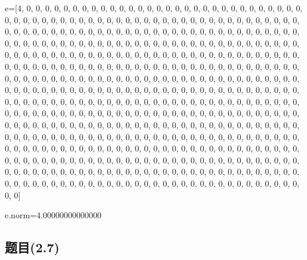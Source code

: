 \documentclass[12pt,a4paper]{article}
\numberwithin{equation}{section}
\begin{document}
e=[4, 0, 0, 0, 0, 0, 0, 0, 0, 0, 0, 0, 0, 0, 0, 0, 0, 0, 0, 0, 0, 0, 0, 0, 0, 0, 0, 0, 0, 0, 0, 0, 0, 0, 0, 0, 0, 0, 0, 0, 0, 0, 0, 0, 0, 0, 0, 0, 0, 0, 0, 0, 0, 0, 0, 0, 0, 0, 0, 0, 0, 0, 0, 0, 0, 0, 0, 0, 0, 0, 0, 0, 0, 0, 0, 0, 0, 0, 0, 0, 0, 0, 0, 0, 0, 0, 0, 0, 0, 0, 0, 0, 0, 0, 0, 0, 0, 0, 0, 0, 0, 0, 0, 0, 0, 0, 0, 0, 0, 0, 0, 0, 0, 0, 0, 0, 0, 0, 0, 0, 0, 0, 0, 0, 0, 0, 0, 0, 0, 0, 0, 0, 0, 0, 0, 0, 0, 0, 0, 0, 0, 0, 0, 0, 0, 0, 0, 0, 0, 0, 0, 0, 0, 0, 0, 0, 0, 0, 0, 0, 0, 0, 0, 0, 0, 0, 0, 0, 0, 0, 0, 0, 0, 0, 0, 0, 0, 0, 0, 0, 0, 0, 0, 0, 0, 0, 0, 0, 0, 0, 0, 0, 0, 0, 0, 0, 0, 0, 0, 0, 0, 0, 0, 0, 0, 0, 0, 0, 0, 0, 0, 0, 0, 0, 0, 0, 0, 0, 0, 0, 0, 0, 0, 0, 0, 0, 0, 0, 0, 0, 0, 0, 0, 0, 0, 0, 0, 0, 0, 0, 0, 0, 0, 0, 0, 0, 0, 0, 0, 0, 0, 0, 0, 0, 0, 0, 0, 0, 0, 0, 0, 0, 0, 0, 0, 0, 0, 0, 0, 0, 0, 0, 0, 0, 0, 0, 0, 0, 0, 0, 0, 0, 0, 0, 0, 0, 0, 0, 0, 0, 0, 0, 0, 0, 0, 0, 0, 0, 0, 0, 0, 0, 0, 0, 0, 0, 0, 0, 0, 0, 0, 0, 0, 0, 0, 0, 0, 0, 0, 0, 0, 0, 0, 0, 0, 0, 0, 0, 0, 0, 0, 0, 0, 0, 0, 0, 0, 0, 0, 0, 0, 0, 0, 0, 0, 0, 0, 0, 0, 0, 0, 0, 0, 0, 0, 0, 0, 0, 0, 0, 0, 0, 0, 0, 0, 0, 0, 0, 0, 0, 0, 0, 0, 0, 0, 0, 0, 0, 0, 0, 0, 0, 0, 0, 0, 0, 0, 0, 0, 0, 0, 0, 0, 0, 0, 0, 0, 0, 0, 0, 0, 0, 0, 0, 0, 0, 0, 0, 0, 0, 0, 0, 0, 0, 0, 0, 0, 0, 0, 0, 0, 0, 0, 0, 0, 0, 0, 0, 0, 0, 0, 0, 0, 0, 0, 0, 0, 0, 0, 0, 0, 0, 0, 0, 0, 0, 0, 0, 0, 0, 0, 0, 0, 0, 0, 0, 0, 0, 0, 0, 0, 0, 0, 0, 0, 0, 0, 0, 0, 0, 0, 0, 0, 0, 0, 0, 0, 0, 0, 0, 0, 0, 0, 0, 0, 0, 0, 0, 0, 0, 0, 0, 0, 0, 0, 0, 0, 0, 0, 0, 0, 0, 0, 0, 0, 0, 0, 0, 0, 0, 0, 0, 0]

e.norm=4.00000000000000

\subsection{题目(2.7)}
\end{document}
